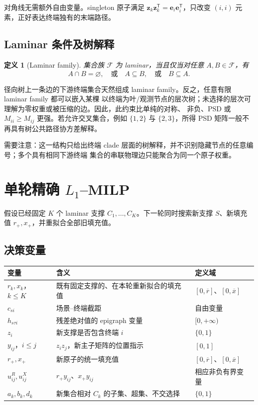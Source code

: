 \documentclass[UTF8,11pt]{ctexart}
\newtheorem{definition}{定义}
\newcommand{\zv}{\bm z}
\begin{document}
对角线无需额外自由变量。singleton 原子满足
$\zv_k\zv_k^{\mathsf T}=\bm e_i\bm e_i^{\mathsf T}$，只改变 $(i,i)$ 元素，正好表达终端独有的末端路径。

\subsection{Laminar 条件及树解释}

\begin{definition}[Laminar family]
集合族 $\mathcal F$ 为 laminar，当且仅当对任意 $A,B\in\mathcal F$，有
\begin{equation}
 A\cap B=\varnothing,
 \quad\text{或}\quad A\subseteq B,
 \quad\text{或}\quad B\subseteq A.
\end{equation}
\end{definition}

径向树上一条边的下游终端集合天然组成 laminar family。反之，任意有限 laminar family 都可以嵌入某棵
以终端为叶/观测节点的层次树；未选择的层次可理解为零权重或被压缩的边。因此，此约束比单纯的对称、
非负、PSD 或 $M_{ii}\ge M_{ij}$ 更强。若允许交叉集合，例如 $\{1,2\}$ 与 $\{2,3\}$，所得 PSD
矩阵一般不再具有树公共路径协方差解释。

需要注意：这一结构只给出终端 clade 层面的树解释，并不识别隐藏节点的任意编号；多个具有相同下游终端
集合的串联物理边只能聚合为同一个原子权重。

\section{单轮精确 \texorpdfstring{$L_1$}{L1}--MILP}

假设已经固定 $K$ 个 laminar 支撑 $C_1,\ldots,C_K$。下一轮同时搜索新支撑 $S$、新填充值
$r_{+},x_{+}$，并重拟合全部旧填充值。

\subsection{决策变量}

\begin{center}
\begin{tabularx}{\textwidth}{>{\raggedright\arraybackslash}p{}X>{\raggedright\arraybackslash}p{}}
\toprule
变量 & 含义 & 定义域 \\
\midrule
$r_k,x_k$，$k\le K$ & 既有固定支撑的、在本轮重新拟合的填充值 & $[0,\overline r]$、$[0,\overline x]$ \\
$c_{si}$ & 场景--终端截距 & 自由变量 \\
$h_{s\tau i}$ & 残差绝对值的 epigraph 变量 & $[0,+\infty)$ \\
$z_i$ & 新支撑是否包含终端 $i$ & $\{0,1\}$ \\
$y_{ij}$，$i\le j$ & $z_i z_j$，新主子矩阵的位置指示 & $[0,1]$ \\
$r_+,x_+$ & 新原子的统一填充值 & $[0,\overline r]$、$[0,\overline x]$ \\
$u^R_{ij},u^X_{ij}$ & $r_+y_{ij}$、$x_+y_{ij}$ & 相应非负有界变量 \\
$a_k,b_k,d_k$ & 新集合相对 $C_k$ 的子集、超集、不交选择 & $\{0,1\}$ \\
\bottomrule
\end{tabularx}
\end{center}
\end{document}
